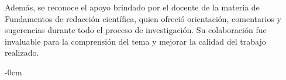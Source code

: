 \documentclass[journal,article,submit,pdftex,moreauthors]{Definitions/mdpi}
\begin{document}
Además, se reconoce el apoyo brindado por el docente de la materia de Fundamentos de redacción científica, quien ofreció orientación, comentarios y sugerencias durante todo el proceso de investigación. Su colaboración fue invaluable para la comprensión del tema y mejorar la calidad del trabajo realizado.

\begin{adjustwidth}{-\extralength}{0cm}
 

 \nocite{*} 


 
\end{adjustwidth}
\end{document}
